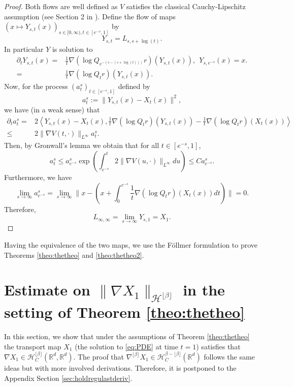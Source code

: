 \documentclass{article}
\begin{document}
\begin{proof}
Both flows are well defined as $V$ satisfies the classical Cauchy-Lipschitz assumption (see Section 2 in \cite{Ambrosio_Crippa_2014}).
Define the flow of maps 
$\left(x\mapsto Y_{s,t}(x)\right)_{s\in [0,\infty),t\in [e^{-s},1]}$ by $$Y_{s,t} = L_{s,s+\log(t)}.$$ In particular $Y$ is solution to
\begin{align*}
 \partial_t Y_{s,t}(x)=&\frac{1}{t}\nabla (\log Q_{e^{-(s-(s+\log(t)))}} r)(Y_{s,t}(x)), \ \ Y_{s,e^{-s}}(x)=x.\\
 =&\frac{1}{t}\nabla (\log Q_{t} r)(Y_{s,t}(x)).
\end{align*}
Now, for the process $(a_t^s)_{t\in [e^{-s},1]}$ defined by
$$a_t^s:=\| Y_{s,t}(x)-X_t(x)\|^2,$$
we have (in a weak sense) that
\begin{align*}
    \partial_t a_t^s =& 2 \left\langle Y_{s,t}(x)-X_t(x),\frac{1}{t}\nabla (\log Q_t r)(Y_{s,t}(x))-\frac{1}{t}\nabla (\log Q_t r)(X_t(x)) \right\rangle\\
    \leq & 2\|\nabla V(t,\cdot)\|_{L^\infty} a_t^s.
\end{align*}
Then, by Gronwall's lemma we obtain that for all $t\in [e^{-s},1]$,
$$a_t^s\leq a^s_{e^{-s}}\exp\left(\int_{e^{-s}}^t 2\|\nabla V(u,\cdot)\|_{L^\infty}du\right) \leq Ca^s_{e^{-s}}.$$
Furthermore, we have
$$\lim_{s\rightarrow \infty} a_{e^{-s}}^s= \lim_{s\rightarrow \infty}\|x-\left(x+\int_0^{e^{-s}} \frac{1}{t}\nabla (\log Q_t r)(X_t(x))dt \right)\|=0.$$
Therefore,
$$L_{\infty,\infty} = \lim_{s\rightarrow \infty} Y_{s,1}=X_1.$$
\end{proof}

Having the equivalence of the two maps, we use the Föllmer formulation to prove Theorems \ref{theo:thetheo} and \ref{theo:thetheo2}.


\section{Estimate on  $\|\nabla X_1\|_{\mathcal{H}^{\lfloor \beta \rfloor}}$ in the setting of Theorem \ref{theo:thetheo}}\label{sec:nablak}
In this section, we show that under the assumptions of Theorem \ref{theo:thetheo} the transport map $X_1$ (the solution to \eqref{eq:PDE} at time $t=1$) satisfies that $\nabla X_1 \in \mathcal{H}^{\lfloor \beta \rfloor}_C(\mathbb{R}^d,\mathbb{R}^{d})$. The proof that $\nabla^{\lfloor \beta \rfloor} X_1 \in \mathcal{H}^{\beta-\lfloor \beta \rfloor}_C(\mathbb{R}^d)$ follows the same ideas but with more involved derivations. Therefore, it is postponed to the Appendix Section \ref{sec:holdregulastderiv}.
\end{document}
